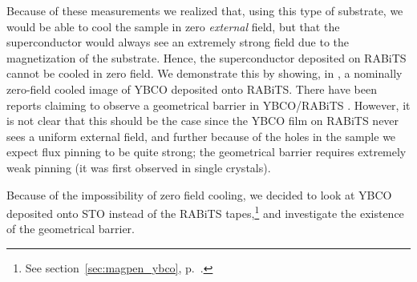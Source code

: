 Because of these measurements we realized that, using this type of 
substrate, we would be able to cool the sample in zero
\emph{external} field, but that the superconductor would always
see an extremely strong field due to the magnetization of the substrate. 
Hence, the superconductor deposited on RABiTS cannot be cooled in 
zero field.
We demonstrate this by showing, in ,
a nominally zero-field cooled image of YBCO deposited onto RABiTS. 
There have been reports claiming to observe a geometrical barrier
\cite{zeldov_prl_73_1428_1994} in YBCO/RABiTS
\cite{kercher_prb_60_6878_2000}. However, it is not clear that this
should be the case since the YBCO film on RABiTS never sees 
a uniform external field, and further because of the holes in the 
sample we expect flux pinning to be quite strong; the geometrical
barrier requires extremely weak pinning (it was first observed in
single crystals). 

Because of the impossibility of zero field cooling, we
decided to look at YBCO deposited onto STO instead of the 
RABiTS tapes,\footnote{See section~\ref{sec:magpen_ybco},
p.~\pageref{sec:magpen_ybco}.} and investigate the existence of the
geometrical barrier.


